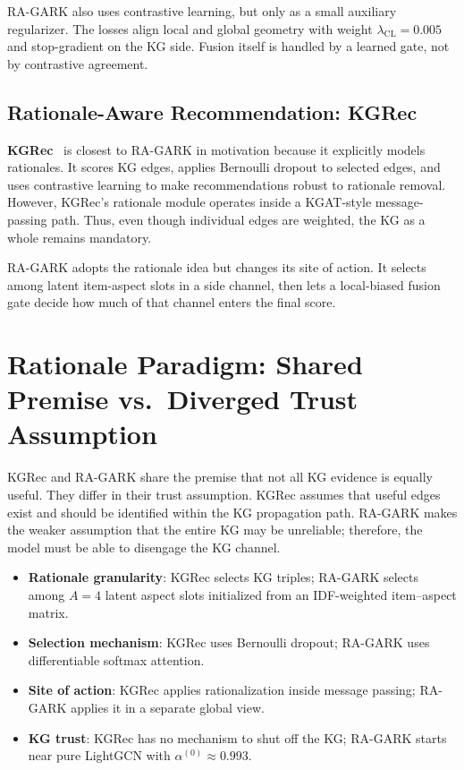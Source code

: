 RA-GARK also uses contrastive learning, but only as a small auxiliary regularizer. The losses align local and global geometry with weight $\lambda_{\mathrm{CL}}=0.005$ and stop-gradient on the KG side. Fusion itself is handled by a learned gate, not by contrastive agreement.

\subsection{Rationale-Aware Recommendation: KGRec}
\label{sec:rw-kgrec}

\textbf{KGRec}~\cite{yang2023kgrec} is closest to RA-GARK in motivation because it explicitly models rationales. It scores KG edges, applies Bernoulli dropout to selected edges, and uses contrastive learning to make recommendations robust to rationale removal. However, KGRec's rationale module operates inside a KGAT-style message-passing path. Thus, even though individual edges are weighted, the KG as a whole remains mandatory.

RA-GARK adopts the rationale idea but changes its site of action. It selects among latent item-aspect slots in a side channel, then lets a local-biased fusion gate decide how much of that channel enters the final score.

\section{Rationale Paradigm: Shared Premise vs.\ Diverged Trust Assumption}
\label{sec:rw-paradigm}

KGRec and RA-GARK share the premise that not all KG evidence is equally useful. They differ in their trust assumption. KGRec assumes that useful edges exist and should be identified within the KG propagation path. RA-GARK makes the weaker assumption that the entire KG may be unreliable; therefore, the model must be able to disengage the KG channel.

\begin{itemize}
  \item \textbf{Rationale granularity}: KGRec selects KG triples; RA-GARK selects among $A=4$ latent aspect slots initialized from an IDF-weighted item--aspect matrix.
  \item \textbf{Selection mechanism}: KGRec uses Bernoulli dropout; RA-GARK uses differentiable softmax attention.
  \item \textbf{Site of action}: KGRec applies rationalization inside message passing; RA-GARK applies it in a separate global view.
  \item \textbf{KG trust}: KGRec has no mechanism to shut off the KG; RA-GARK starts near pure LightGCN with $\alpha^{(0)} \approx 0.993$.
\end{itemize}

